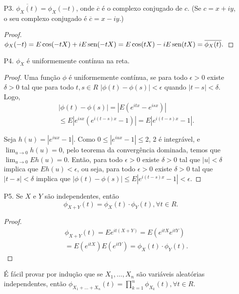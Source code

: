 \begin{frame}
\begin{enumerate}

\item[P3.] $\overline{\phi_X(t)}=\phi_X(-t)$, onde $\overline{c}$
é o complexo conjugado de $c$. (Se $c=x+iy$, o seu complexo
conjugado é $\overline{c}=x-iy$.)

\begin{proof}
$\phi_X(-t)=E\cos(-tX)+iE\mbox{\,sen}(-tX)=
E\cos(tX)-iE\mbox{\,sen}(tX)=\overline{\phi_X(t)}.$
\end{proof}

\item[P4.] $\phi_X$ é uniformemente contínua na reta.

\begin{proof} Uma função $\phi$ é uniformemente contínua, se para todo
$\epsilon>0$ existe $\delta>0$ tal que para todo $t,s\in R$
$|\phi(t)-\phi(s)|<\epsilon$ quando $|t-s|<\delta$. Logo,
\begin{eqnarray}
& & |\phi(t)-\phi(s)|=|E(e^{itx}-e^{isx})|\nonumber\\
& & \leq E|e^{isx}(e^{i(t-s)x}-1)|=E|e^{i(t-s)x}-1|.\nonumber
\end{eqnarray}

Seja $h(u)=|e^{iux}-1|$. Como $0\leq |e^{iux}-1|\leq 2$, 2 é
integrável, e $\lim_{u\rightarrow 0}h(u)=0$, pelo teorema da
convergência dominada, temos que $\lim_{u\rightarrow 0}Eh(u)=0$.
Então, para todo $\epsilon>0$ existe $\delta>0$ tal que $|u|<\delta$
implica que $Eh(u)<\epsilon$, ou seja, para todo $\epsilon>0$ existe
$\delta>0$ tal que $|t-s|<\delta$ implica que $|\phi(t)-\phi(s)|\leq
E|e^{i(t-s)x}-1|<\epsilon$. \end{proof}

\end{enumerate}
\end{frame}


\begin{frame}


\begin{enumerate}

\item[P5.] Se $X$ e $Y$ são independentes, então $$\phi_{X+Y}(t)=\phi_X(t)\cdot\phi_Y(t),\forall t\in
R.$$

\begin{proof}
\begin{eqnarray}
& & \phi_{X+Y}(t)=Ee^{it(X+Y)}=E(e^{itX}e^{itY})\nonumber\\
& & =E(e^{itX})E(e^{itY})=\phi_X(t)\cdot\phi_Y(t).
\nonumber
\end{eqnarray}
\end{proof}

É fácil provar por indução que se $X_1,\ldots, X_n$ são variáveis
aleatórias independentes, então
$\phi_{X_1+\ldots+X_n}(t)=\prod_{k=1}^{n}\phi_{X_k}(t), \forall t\in
R$.

\end{enumerate}

\end{frame}


